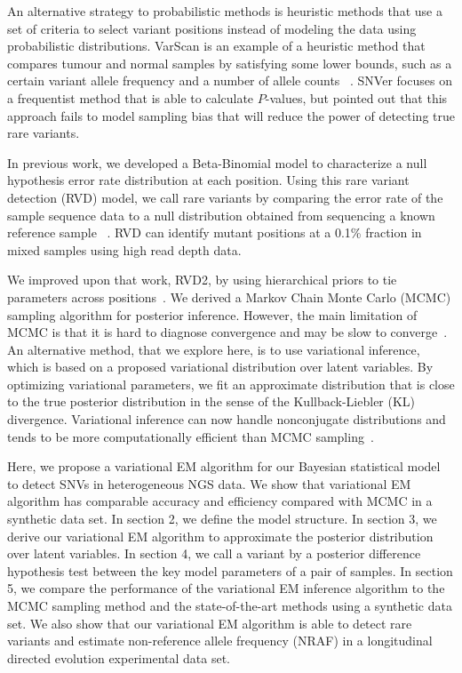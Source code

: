 \documentclass[11pt,reqno]{amsart}
\begin{document}
An alternative strategy to probabilistic methods is heuristic methods that use a set of criteria to select variant positions instead of modeling the data using probabilistic distributions.
VarScan is an example of a heuristic method that compares tumour and normal samples by satisfying some lower bounds, such as a certain variant allele frequency and a number of allele counts ~\citep{koboldt2012varscan}.
SNVer focuses on a frequentist method that is able to calculate $P$-values, but \citet{wei2011snver} pointed out that this approach fails to model sampling bias that will reduce the power of detecting true rare variants.

In previous work, we developed a Beta-Binomial model to characterize a null hypothesis error rate distribution at each position.
Using this rare variant detection (RVD) model, we call rare variants by comparing the error rate of the sample sequence data to a null distribution obtained from sequencing a known reference sample ~\citep{flaherty2011ultrasensitive}.
RVD can identify mutant positions at a 0.1\% fraction in mixed samples using high read depth data.

We improved upon that work, RVD2, by using hierarchical priors to tie parameters across positions~\citep{he2015rvd2}.
We derived a Markov Chain Monte Carlo (MCMC) sampling algorithm for posterior inference.
However, the main limitation of MCMC is that it is hard to diagnose convergence and may be slow to converge~\citep{jordan1999introduction}.
An alternative method, that we explore here, is to use variational inference, which is based on a proposed variational distribution over latent variables.
By optimizing variational parameters, we fit an approximate distribution that is close to the true posterior distribution in the sense of the Kullback-Liebler (KL) divergence.
Variational inference can now handle nonconjugate distributions and tends to be more computationally efficient than MCMC sampling~\citep{peterson1989explorations}.

Here, we propose a variational EM algorithm for our Bayesian statistical model to detect SNVs in heterogeneous NGS data.
We show that variational EM algorithm has comparable accuracy and efficiency compared with MCMC in a synthetic data set.
In section 2, we define the model structure.
In section 3, we derive our variational EM algorithm to approximate the posterior distribution over latent variables.
In section 4, we call a variant by a posterior difference hypothesis test between the key model parameters of a pair of samples.
In section 5, we compare the performance of the variational EM inference algorithm to the MCMC sampling method and the state-of-the-art methods using a synthetic data set.
We also show that our variational EM algorithm is able to detect rare variants and estimate non-reference allele frequency (NRAF) in a longitudinal directed evolution experimental data set.
\end{document}
